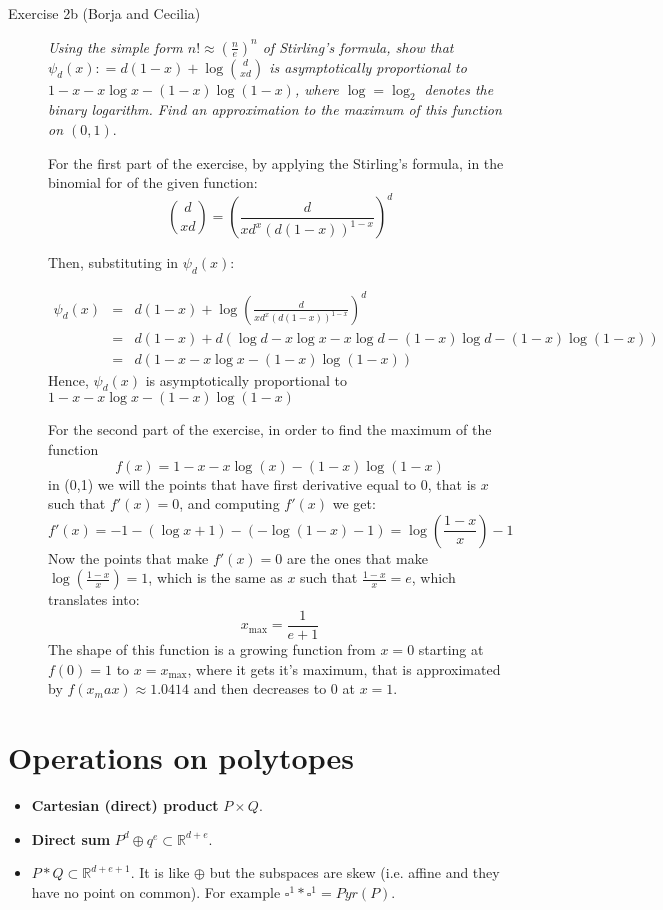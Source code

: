 \begin{description}
\item[Exercise 2b (Borja and Cecilia)] \textit{Using the simple form $n!\approx \left(\frac{n}{e}\right)^n$ of Stirling's formula, show that $\psi_d(x) : = d(1-x)+ \log  \binom {d} {xd}$ is asymptotically proportional to $1-x-x\log x - (1-x)\log(1-x)$, where  $\log = \log_2$ denotes the binary logarithm. Find an approximation to the maximum of this function on $(0,1)$}.

\bigskip
For the first part of the exercise, by applying the Stirling's formula, in the binomial for of the given function:
\[\binom{d}{xd} = \left(\frac{d}{xd^x (d(1-x))^{1-x}}\right)^d\]

Then, substituting in $\psi_d(x)$:

\begin{eqnarray*}
\psi_d(x) &=& d(1-x) + \log \left(\frac{d}{xd^x (d(1-x))^{1-x}}\right)^d \\
&=& d(1-x) + d\left(\log{d} - x\log{x} - x\log{d} - (1-x)\log{d} - (1-x) \log{(1-x)}\right)\\
&=& d (1-x-x\log x - (1-x)\log(1-x))
\end{eqnarray*}
Hence, $\psi_d(x)$ is asymptotically proportional to $1-x-x\log x - (1-x)\log(1-x)$
\bigskip

For the second part of the exercise, in order to find the maximum of the function
\begin{equation*}
f(x)=1-x-x\log(x)-(1-x)\log(1-x)
\end{equation*}
in (0,1) we will the points that have first derivative equal to 0, that is $x$ such that $f'(x)=0$, and computing $f'(x)$ we get:
\begin{equation*}
f'(x)=-1-(\log x+1)-(-\log(1-x)-1)=\log\left(\frac{1-x}{x}\right)-1
\end{equation*}
Now the points that make $f'(x)=0$ are the ones that make $\log(\frac{1-x}{x})=1$, which is the same as $x$ such that $\frac{1-x}{x}=e$, which translates into:
\begin{equation*}
x_{\max}=\frac{1}{e+1}
\end{equation*}
The shape of this function is a growing function from $x=0$ starting at $f(0)=1$ to $x=x_{\max}$, where it gets it's maximum, that is approximated by $f(x_max)\approx1.0414$  and then decreases to $0$ at $x=1$.
\end{description}

\section{Operations on polytopes}
\begin{itemize}
\item \textbf{Cartesian (direct) product} $P\times Q$.
\item \textbf{Direct sum} $P^d \oplus q^e \subset \mathbb{R}^{d+e}$.
\item $P*Q\subset \mathbb{R}^{d+e+1}$. It is like $\oplus$ but the subspaces are skew (i.e. affine and they have no point on common). For example $\square^1 *\square^1 = Pyr(P)$.
\end{itemize}

